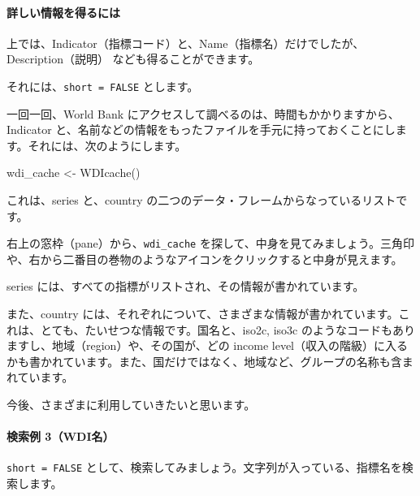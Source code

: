 \documentclass[
]{bxjsbook}
\newenvironment{Shaded}{\begin{snugshade}}{\end{snugshade}}
\newcommand{\FunctionTok}[1]{\textcolor[rgb]{0.00,0.00,0.00}{#1}}
\newcommand{\NormalTok}[1]{#1}
\newcommand{\OtherTok}[1]{\textcolor[rgb]{0.56,0.35,0.01}{#1}}
\theoremstyle{definition}
\theoremstyle{definition}
\theoremstyle{definition}
\theoremstyle{definition}
\theoremstyle{remark}
\begin{document}
\hypertarget{ux8a73ux3057ux3044ux60c5ux5831ux3092ux5f97ux308bux306bux306f}{%
\paragraph{詳しい情報を得るには}\label{ux8a73ux3057ux3044ux60c5ux5831ux3092ux5f97ux308bux306bux306f}}

上では、Indicator（指標コード）と、Name（指標名）だけでしたが、Description（説明） なども得ることができます。

それには、\texttt{short\ =\ FALSE} とします。

一回一回、World Bank にアクセスして調べるのは、時間もかかりますから、Indicator と、名前などの情報をもったファイルを手元に持っておくことにします。それには、次のようにします。

\begin{Shaded}
\begin{Highlighting}[]
\NormalTok{wdi\_cache }\OtherTok{\textless{}{-}} \FunctionTok{WDIcache}\NormalTok{()}
\end{Highlighting}
\end{Shaded}

これは、series と、country の二つのデータ・フレームからなっているリストです。

右上の窓枠（pane）から、\texttt{wdi\_cache} を探して、中身を見てみましょう。三角印や、右から二番目の巻物のようなアイコンをクリックすると中身が見えます。

series には、すべての指標がリストされ、その情報が書かれています。

また、country には、それぞれについて、さまざまな情報が書かれています。これは、とても、たいせつな情報です。国名と、iso2c, iso3c のようなコードもありますし、地域（region）や、その国が、どの income level（収入の階級）に入るかも書かれています。また、国だけではなく、地域など、グループの名称も含まれています。

今後、さまざまに利用していきたいと思います。

\hypertarget{ux691cux7d22ux4f8b-3wdiux540d}{%
\paragraph{検索例 3（WDI名）}\label{ux691cux7d22ux4f8b-3wdiux540d}}

\texttt{short\ =\ FALSE} として、検索してみましょう。文字列が入っている、指標名を検索します。
\end{document}
